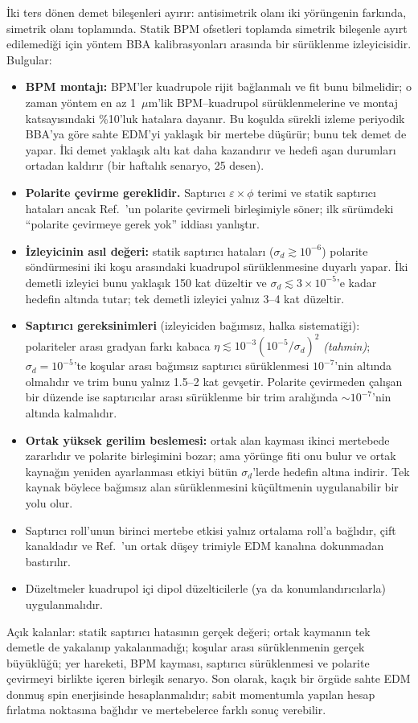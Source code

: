 \documentclass[12pt,a4paper]{extarticle}
\newcommand{\tahmin}{\textit{(tahmin)}}
\begin{document}
İki ters dönen demet bileşenleri ayırır: antisimetrik olanı iki yörüngenin farkında, simetrik olanı toplamında.
Statik BPM ofsetleri toplamda simetrik bileşenle ayırt edilemediği için yöntem BBA kalibrasyonları arasında bir
sürüklenme izleyicisidir. Bulgular:
\begin{itemize}
\item \textbf{BPM montajı:} BPM'ler kuadrupole rijit bağlanmalı ve fit bunu bilmelidir; o zaman yöntem en az
1~$\mu$m'lik BPM--kuadrupol sürüklenmelerine ve montaj katsayısındaki \%10'luk hatalara dayanır. Bu koşulda
sürekli izleme periyodik BBA'ya göre sahte EDM'yi yaklaşık bir mertebe düşürür; bunu tek demet de yapar. İki
demet yaklaşık altı kat daha kazandırır ve hedefi aşan durumları ortadan kaldırır (bir haftalık senaryo, 25 desen).
\item \textbf{Polarite çevirme gereklidir.} Saptırıcı $\varepsilon\times\phi$ terimi ve statik saptırıcı
hataları ancak Ref.~\cite{omarov}'un polarite çevirmeli birleşimiyle söner; ilk sürümdeki ``polarite çevirmeye
gerek yok'' iddiası yanlıştır.
\item \textbf{İzleyicinin asıl değeri:} statik saptırıcı hataları ($\sigma_d\gtrsim10^{-6}$) polarite söndürmesini
iki koşu arasındaki kuadrupol sürüklenmesine duyarlı yapar. İki demetli izleyici bunu yaklaşık 150 kat düzeltir ve
$\sigma_d\lesssim3\times10^{-5}$'e kadar hedefin altında tutar; tek demetli izleyici yalnız 3--4 kat düzeltir.
\item \textbf{Saptırıcı gereksinimleri} (izleyiciden bağımsız, halka sistematiği): polariteler arası gradyan farkı
kabaca $\eta\lesssim10^{-3}(10^{-5}/\sigma_d)^2$ \tahmin; $\sigma_d=10^{-5}$'te koşular arası bağımsız saptırıcı
sürüklenmesi $10^{-7}$'nin altında olmalıdır ve trim bunu yalnız 1.5--2 kat gevşetir. Polarite çevirmeden
çalışan bir düzende ise saptırıcılar arası sürüklenme bir trim aralığında $\sim10^{-7}$'nin altında kalmalıdır.
\item \textbf{Ortak yüksek gerilim beslemesi:} ortak alan kayması ikinci mertebede zararlıdır ve polarite
birleşimini bozar; ama yörünge fiti onu bulur ve ortak kaynağın yeniden ayarlanması etkiyi bütün $\sigma_d$'lerde
hedefin altına indirir. Tek kaynak böylece bağımsız alan sürüklenmesini küçültmenin uygulanabilir bir yolu olur.
\item Saptırıcı roll'unun birinci mertebe etkisi yalnız ortalama roll'a bağlıdır, çift kanaldadır ve
Ref.~\cite{omarov}'un ortak düşey trimiyle EDM kanalına dokunmadan bastırılır.
\item Düzeltmeler kuadrupol içi dipol düzelticilerle (ya da konumlandırıcılarla) uygulanmalıdır.
\end{itemize}
Açık kalanlar: statik saptırıcı hatasının gerçek değeri; ortak kaymanın tek demetle de yakalanıp yakalanmadığı;
koşular arası sürüklenmenin gerçek büyüklüğü; yer hareketi, BPM kayması, saptırıcı sürüklenmesi ve polarite
çevirmeyi birlikte içeren birleşik senaryo. Son olarak, kaçık bir örgüde sahte EDM donmuş spin enerjisinde
hesaplanmalıdır; sabit momentumla yapılan hesap fırlatma noktasına bağlıdır ve mertebelerce farklı sonuç
verebilir.
\end{document}
